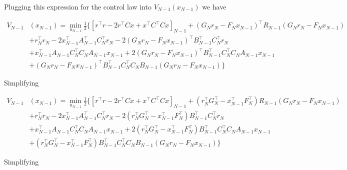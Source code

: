 \documentclass[11pt,letterpaper,onecolumn,notitlepage]{article}
\begin{document}
  Plugging this expression for the control law into $V_{N-1}(x_{N-1})$ we have

  \begin{equation*}
    \begin{split}
      V_{N-1}&(x_{N-1})=\min_{u_{N-1}}\frac{1}{2}\biggr\{
      \left[r^{\top}r-2r^{\top}Cx+x^{\top}C^{\top}Cx\right]_{N-1}+(G_{N}r_{N}-F_{N}x_{N-1})^{\top}R_{N-1}(G_{N}r_{N}-F_{N}x_{N-1}) \\
      &+r_{N}^{\top}r_{N}
      -2x_{N-1}^{\top}A_{N-1}^{\top}C_{N}^{\top}r_{N}-2(G_{N}r_{N}-F_{N}x_{N-1})^{\top}B_{N-1}^{\top}C_{N}^{\top}r_{N} \\
      &+x_{N-1}^{\top}A_{N-1}C_{N}^{\top}C_{N}A_{N-1}x_{N-1}
      +2(G_{N}r_{N}-F_{N}x_{N-1})^{\top}B_{N-1}^{\top}C_{N}^{\top}C_{N}A_{N-1}x_{N-1} \\
      &+(G_{N}r_{N}-F_{N}x_{N-1})^{\top}B_{N-1}^{\top}C_{N}^{\top}C_{N}B_{N-1}(G_{N}r_{N}-F_{N}x_{N-1})
      \biggr\}
    \end{split}
  \end{equation*}

  Simplifying

  \begin{equation*}
    \begin{split}
      V_{N-1}&(x_{N-1})=\min_{u_{N-1}}\frac{1}{2}\biggr\{
      \left[r^{\top}r-2r^{\top}Cx+x^{\top}C^{\top}Cx\right]_{N-1}
      +(r_{N}^{\top}G_{N}^{\top}-x_{N-1}^{\top}F_{N}^{\top})R_{N-1}(G_{N}r_{N}-F_{N}x_{N-1}) \\
      &+r_{N}^{\top}r_{N}
      -2x_{N-1}^{\top}A_{N-1}^{\top}C_{N}^{\top}r_{N}
      -2(r_{N}^{\top}G_{N}^{\top}-x_{N-1}^{\top}F_{N}^{\top})B_{N-1}^{\top}C_{N}^{\top}r_{N} \\
      &+x_{N-1}^{\top}A_{N-1}C_{N}^{\top}C_{N}A_{N-1}x_{N-1}
      +2(r_{N}^{\top}G_{N}^{\top}-x_{N-1}^{\top}F_{N}^{\top})B_{N-1}^{\top}C_{N}^{\top}C_{N}A_{N-1}x_{N-1} \\
      &+(r_{N}^{\top}G_{N}^{\top}-x_{N-1}^{\top}F_{N}^{\top})B_{N-1}^{\top}C_{N}^{\top}C_{N}B_{N-1}(G_{N}r_{N}-F_{N}x_{N-1})
      \biggr\}
    \end{split}
  \end{equation*}

  Simplifying
\end{document}
